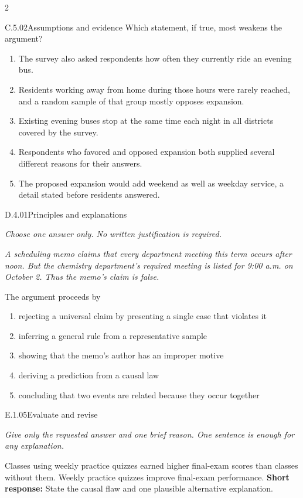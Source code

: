 \documentclass[9pt]{extarticle}
\newcommand{\choice}[1]{\item #1}
\begin{document}
\begin{multicols}{2}
\begin{DenseCoreProblem}{C.5.02}{Assumptions and evidence}
Which statement, if true, most weakens the argument?
\begin{enumerate}[label=(\alph*)]
  \choice{The survey also asked respondents how often they currently ride an evening bus.}
  \choice{Residents working away from home during those hours were rarely reached, and a random sample of that group mostly opposes expansion.}
  \choice{Existing evening buses stop at the same time each night in all districts covered by the survey.}
  \choice{Respondents who favored and opposed expansion both supplied several different reasons for their answers.}
  \choice{The proposed expansion would add weekend as well as weekday service, a detail stated before residents answered.}
\end{enumerate}
\end{DenseCoreProblem}
\begin{DenseCoreProblem}{D.4.01}{Principles and explanations}
{\scriptsize\textit{Choose one answer only. No written justification is required.}\par}
\emph{A scheduling memo claims that every department meeting this term occurs after noon. But the chemistry department's required meeting is listed for 9:00 a.m. on October 2. Thus the memo's claim is false.}

The argument proceeds by
\begin{enumerate}[label=(\alph*)]
  \choice{rejecting a universal claim by presenting a single case that violates it}
  \choice{inferring a general rule from a representative sample}
  \choice{showing that the memo's author has an improper motive}
  \choice{deriving a prediction from a causal law}
  \choice{concluding that two events are related because they occur together}
\end{enumerate}
\end{DenseCoreProblem}
\begin{DenseCoreProblem}{E.1.05}{Evaluate and revise}
{\scriptsize\textit{Give only the requested answer and one brief reason. One sentence is enough for any explanation.}\par}
Classes using weekly practice quizzes earned higher final-exam scores than classes without them. Weekly practice quizzes improve final-exam performance.
\textbf{Short response:} State the causal flaw and one plausible alternative explanation.
\end{DenseCoreProblem}
\end{multicols}
\CoreWorkArea
\FormBreak
{}
\end{document}
